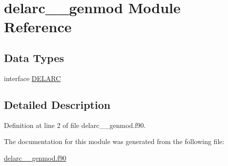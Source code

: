 \hypertarget{classdelarc____genmod}{\section{delarc\+\_\+\+\_\+genmod Module Reference}
\label{classdelarc____genmod}
}
\subsection*{Data Types}
\begin{DoxyCompactItemize}
\item 
interface \hyperlink{interfacedelarc____genmod_1_1DELARC}{D\+E\+L\+A\+R\+C}
\end{DoxyCompactItemize}


\subsection{Detailed Description}


Definition at line 2 of file delarc\+\_\+\+\_\+genmod.\+f90.



The documentation for this module was generated from the following file\+:\begin{DoxyCompactItemize}
\item 
\hyperlink{delarc____genmod_8f90}{delarc\+\_\+\+\_\+genmod.\+f90}\end{DoxyCompactItemize}
